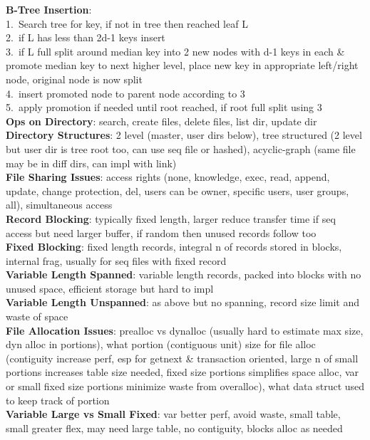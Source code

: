 \documentclass[a4paper]{article}
\begin{document}
\begin{multicols}{2}
        \textbf{B-Tree Insertion}:\\
        1.\ Search tree for key, if not in tree then reached leaf L\\
        2.\ if L has less than 2d-1 keys insert\\
        3.\ if L full split around median key into 2 new nodes with d-1 keys in each \& promote median key to next higher level, place new key in appropriate left/right node, original node is now split\\
        4.\ insert promoted node to parent node according to 3\\
        5.\ apply promotion if needed until root reached, if root full split using 3\\
        \textbf{Ops on Directory}: search, create files, delete files, list dir, update dir
        \textbf{Directory Structures}: 2 level (master, user dirs below), tree structured (2 level but user dir is tree root too, can use seq file or hashed), acyclic-graph (same file may be in diff dirs, can impl with link)\\
        \textbf{File Sharing Issues}: access rights (none, knowledge, exec, read, append, update, change protection, del, users can be owner, specific users, user groups, all), simultaneous access\\
        \textbf{Record Blocking}: typically fixed length, larger reduce transfer time if seq access but need larger buffer, if random then unused records follow too\\
        \textbf{Fixed Blocking}: fixed length records, integral n of records stored in blocks, internal frag, usually for seq files with fixed record\\
        \textbf{Variable Length Spanned}: variable length records, packed into blocks with no unused space, efficient storage but hard to impl\\
        \textbf{Variable Length Unspanned}: as above but no spanning, record size limit and waste of space\\
        \textbf{File Allocation Issues}: prealloc vs dynalloc (usually hard to estimate max size, dyn alloc in portions), what portion (contiguous unit) size for file alloc (contiguity increase perf, esp for getnext \& transaction oriented, large n of small portions increases table size needed, fixed size portions simplifies space alloc, var or small fixed size portions minimize waste from overalloc), what data struct used to keep track of portion\\
        \textbf{Variable Large vs Small Fixed}: var better perf, avoid waste, small table, small greater flex, may need large table, no contiguity, blocks alloc as needed\\

\end{multicols}
\end{document}
